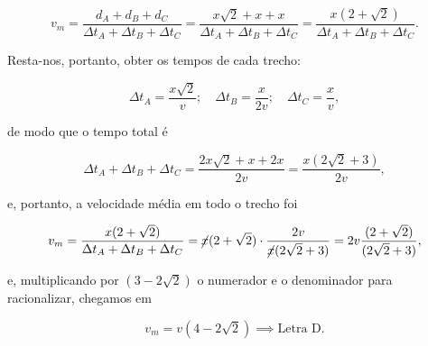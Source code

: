 \begin{exemplo}
$$ v_m = \dfrac{d_A+d_B+d_C}{\Delta t_A+\Delta t_B+\Delta t_C}=\dfrac{x\sqrt 2+x+x}{\Delta t_A+\Delta t_B+\Delta t_C} = \dfrac{x(2+\sqrt 2)}{\Delta t_A+\Delta t_B+\Delta t_C} .$$

Resta-nos, portanto, obter os tempos de cada trecho:

$$ \Delta t_A=\dfrac{x\sqrt 2}{v}; \quad \Delta t_B=\dfrac{x}{2v}; \quad \Delta t_C=\dfrac{x}{v},$$

\noindent de modo que o tempo total é 

$$\Delta t_A+\Delta t_B+\Delta t_C =  \dfrac{2x\sqrt 2+x+2x}{2v} = \dfrac{x(2\sqrt 2+3)}{2v}, $$

\noindent e, portanto, a velocidade média em todo o trecho foi


$$v_m =\dfrac{x(2+\sqrt2)}{\Delta t_A+\Delta t_B+\Delta t_C} = \cancel{x}(2+\sqrt2) \cdot \dfrac{2v}{\cancel{x}(2\sqrt2+3)} =2v\dfrac{(2+\sqrt2)}{(2\sqrt2+3)},$$

\noindent e, multiplicando por $(3-2\sqrt2)$ o numerador e o denominador para racionalizar, chegamos em

$$  \boxed{ v_m=v(4-2\sqrt2) \implies \text{Letra D.}}$$


    
\end{exemplo}


\vspace{0.3cm}




